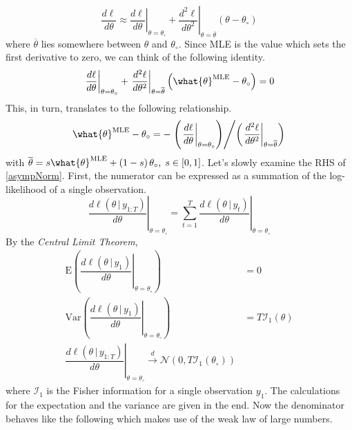 \documentclass[answers]{exam}
\begin{document}
\begin{questions}
\begin{solution}
\begin{enumerate}[a)]
\begin{itemize}
      \begin{equation}
        \dfrac{d\ell}{d\theta} \approx \left.\dfrac{d\ell}{d\theta}\right|_{\theta=\theta_{\circ}}+\left.\dfrac{d^{2}\ell}{d\theta^{2}}\right|_{\theta=\overline{\theta}}\left(\theta-\theta_{\circ}\right)
      \end{equation}
      where $\overline{\theta}$ lies somewhere between $\theta$ and $\theta_{\circ}$. Since MLE is the value which sets the first derivative to zero, we can think of the following identity.
      \begin{equation}
        \left.\dfrac{d\ell}{d\theta}\right|_{\theta=\theta_{\circ}}+\left.\dfrac{d^{2}\ell}{d\theta^{2}}\right|_{\theta=\overline{\theta}}\left(\what{\theta}^{\text{MLE}}-\theta_{\circ}\right)=0
      \end{equation}
      This, in turn, translates to the following relationship.
      \begin{equation}\label{asympNorm}
        \what{\theta}^{\text{MLE}}-\theta_{\circ} =-\left.\left(\left.\dfrac{d\ell}{d\theta}\right|_{\theta=\theta_{\circ}}\right)\middle/\left(\left.\dfrac{d^{2}\ell}{d\theta^{2}}\right|_{\theta=\overline{\theta}}\right)\right.
      \end{equation}
      with $\overline{\theta} = s\what{\theta}^{\text{MLE}}+\left(1-s\right)\theta_{\circ},\; s\in\left[0,1\right]$. Let's slowly examine the RHS of \ref{asympNorm}. First, the numerator can be expressed as a summation of the log-likelihood of a single observation.
      \begin{equation}
        \left.\dfrac{d\ell\left(\theta\,|\,y_{1:T}\right)}{d\theta}\right|_{\theta=\theta_{\circ}} = \sum_{t=1}^{T}\left.\dfrac{d\ell\left(\theta\,|\,y_{t}\right)}{d\theta}\right|_{\theta=\theta_{\circ}}
      \end{equation}
      By the \emph{Central Limit Theorem},
      \begin{align}\label{CLT}
        \mathrm{E}\left(\left.\dfrac{d\ell\left(\theta\,|\,y_{1}\right)}{d\theta}\right|_{\theta=\theta_{\circ}}\right) &= 0\\
        \mathrm{Var}\left(\left.\dfrac{d\ell\left(\theta\,|\,y_{1}\right)}{d\theta}\right|_{\theta=\theta_{\circ}}\right) &= T\mathcal{I}_{1}\left(\theta\right)\\
        \left.\dfrac{d\ell\left(\theta\,|\,y_{1:T}\right)}{d\theta}\right|_{\theta=\theta_{\circ}} \xrightarrow{d} \mathcal{N}\left(0,T\mathcal{I}_{1}\left(\theta_{\circ}\right)\right)
      \end{align}
      where $\mathcal{I}_{1}$ is the Fisher information for a single observation $y_{1}$. The calculations for the expectation and the variance are given in the end. Now the denominator behaves like the following which makes use of the weak law of large numbers.

\end{itemize}
\end{enumerate}
\end{solution}
\end{questions}
\end{document}
